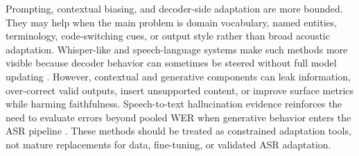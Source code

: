 \documentclass[pdflatex,sn-basic]{sn-jnl}
\theoremstyle{thmstyleone}
\theoremstyle{thmstyletwo}
\theoremstyle{thmstylethree}
\begin{document}
Prompting, contextual biasing, and decoder-side adaptation are more bounded. They may help when the main problem is domain vocabulary, named entities, terminology, code-switching cues, or output style rather than broad acoustic adaptation. Whisper-like and speech-language systems make such methods more visible because decoder behavior can sometimes be steered without full model updating \citep{pmlr-v202-radford23a,tian25b_interspeech}. However, contextual and generative components can leak information, over-correct valid outputs, insert unsupported content, or improve surface metrics while harming faithfulness. Speech-to-text hallucination evidence reinforces the need to evaluate errors beyond pooled WER when generative behavior enters the ASR pipeline \citep{koenecke2024carelesswhisper}. These methods should be treated as constrained adaptation tools, not mature replacements for data, fine-tuning, or validated ASR adaptation.
\end{document}
